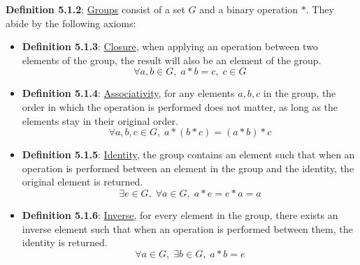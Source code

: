 \documentclass{article}
\newcommand{\separate}[1] {\vspace{#1 pt}\noindent}
\newcommand{\definition}[2]{\textbf{Definition #1}: #2\label{def:#1}}
\begin{document}
\separate{7}\definition{5.1.2}{\underline{Groups} consist of a set \(G\) and a binary operation \(*\). They abide by the following axioms:}
\begin{itemize}
    \item \definition{5.1.3}{\underline{Closure}, when applying an operation between two elements of the group, the result will also be an element of the group.}
    \begin{equation}
        \forall a,b \in G,\; a*b = c,\; c \in G
    \end{equation}
    \item \definition{5.1.4}{\underline{Associativity}, for any elements \(a,b,c\) in the group, the order in which the operation is performed does not matter, as long as the elements stay in their original order.}
    \begin{equation}
        \forall a,b,c \in G,\; a*(b*c) = (a*b)*c
    \end{equation}
    \item \definition{5.1.5}{\underline{Identity}, the group contains an element such that when an operation is performed between an element in the group and the identity, the original element is returned.}
    \begin{equation}
        \exists e \in G,\; \forall a \in G,\; a*e = e*a = a
    \end{equation}
    \item \definition{5.1.6}{\underline{Inverse}, for every element in the group, there exists an inverse element such that when an operation is performed between them, the identity is returned.}
    \begin{equation}
        \forall a \in G,\; \exists b \in G,\; a*b = e
    \end{equation}
\end{itemize}
\end{document}
